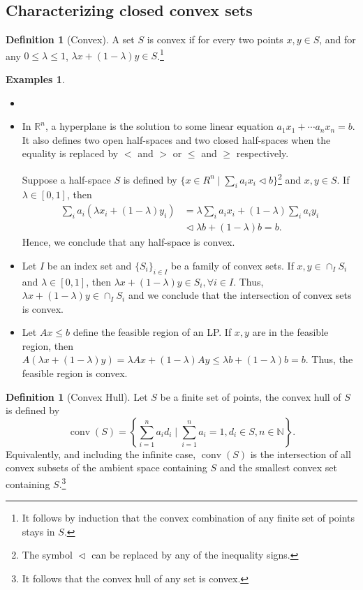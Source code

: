 \documentclass{tufte-handout}
\theoremstyle{definition}
\newtheorem{defn}[thm]{Definition}
\newtheorem{exmps}[thm]{Examples}
\theoremstyle{remark}
\newcommand{\R}{\mathbb{R}}
\newcommand{\N}{\mathbb{N}}
\DeclareMathOperator{\conv}{conv}
\begin{document}
\subsection{Characterizing closed convex sets}
\begin{defn}[Convex]
	A set $S$ is convex if for every two points $x,y \in S$, and for any $0\leq \lambda \leq 1$, $\lambda x + (1-\lambda)y \in S$.\footnote{It follows by induction that the convex combination of any finite set of points stays in $S$.}
\end{defn}
\begin{exmps}
	\begin{itemize}
		\item[]
		\item In $\R^n$, a hyperplane is the solution to some linear equation $a_1x_1 + \cdots a_nx_n = b$. It also defines two open half-spaces and two closed half-spaces when the equality is replaced by $<$ and $>$ or $\leq$ and $\geq$ respectively.
		
		Suppose a half-space $S$ is defined by $\{x \in R^n\mid \sum_i a_i x_i \vartriangleleft  b\}$\footnote{The symbol $\vartriangleleft$ can be replaced by any of the inequality signs.} and $x, y\in S$. If $\lambda \in [0,1]$, then 
		\begin{align*}
			\sum_i a_i(\lambda x_i + (1-\lambda)y_i) &= \lambda \sum_i a_ix_i + (1-\lambda)\sum_i a_iy_i\\
			&\vartriangleleft \lambda b + (1-\lambda) b = b.
		\end{align*}
		Hence, we conclude that any half-space is convex.
		
		\item Let $I$ be an index set and $\{S_i\}_{i\in I}$ be a family of convex sets. If $x,y \in \cap_I S_i$ and $\lambda \in [0,1]$, then $\lambda x + (1-\lambda)y \in S_i, \forall i \in I$. Thus, $\lambda x + (1-\lambda)y \in \cap_I S_i$ and we conclude that the intersection of convex sets is convex.
		
		\item Let $Ax\leq b$ define the feasible region of an LP. If $x, y$ are in the feasible region, then $A(\lambda x+ (1-\lambda)y) = \lambda Ax + (1-\lambda)Ay \leq \lambda b + (1-\lambda)b = b$. Thus, the feasible region is convex.
	\end{itemize}
\end{exmps}

\begin{defn}[Convex Hull]
	Let $S$ be a finite set of points, the convex hull of $S$ is defined by 
	$$ \conv(S) = \left\{\sum_{i=1}^{n} a_i d_i \mid \sum_{i=1}^n a_i = 1, d_i \in S, n \in \N\right\}.$$
	Equivalently, and including the infinite case, $\conv(S)$ is the intersection of all convex subsets of the ambient space containing $S$ and the smallest convex set containing $S$.\footnote{It follows that the convex hull of any set is convex.}
\end{defn}
\end{document}
